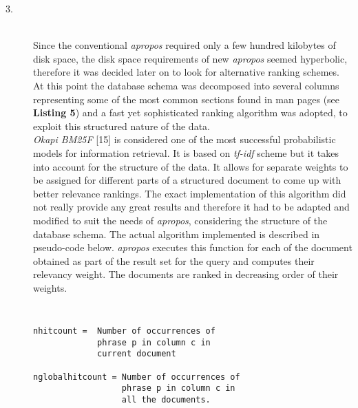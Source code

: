 \documentclass[letterpaper,twocolumn,10pt]{article}
\begin{document}
\begin{description}
\item[3.] \hfill \\
Since the conventional \textit{apropos} required only a few hundred kilobytes of
disk space, the disk space requirements of new \textit{apropos} seemed
hyperbolic, therefore it was decided later on to look for alternative ranking
schemes. At this point the database schema was decomposed into several columns
representing some of the most common sections found in man pages
(see {\bf Listing 5}) and a fast yet sophisticated ranking algorithm was adopted,
to exploit this structured nature of the data. \\

\emph{Okapi BM25F} [15] is considered one of the most successful probabilistic
models for information retrieval. It is based on \emph{tf-idf}
scheme but it takes into account for the structure of the data. It allows for
separate weights to be assigned for different parts of a structured document to
come up with better relevance rankings. The exact implementation of this
algorithm did not really provide any great results and therefore it had to be
adapted and modified to suit the needs of \textit{apropos}, considering the
structure of the database schema. The actual algorithm implemented is
described in pseudo-code below. \textit{apropos} executes this function for each
of the document obtained as part of the result set for the query and computes
their relevancy weight. The documents are ranked in decreasing order of their
weights. \\

{\tt
{}
\begin{lstlisting}
nhitcount =  Number of occurrences of
             phrase p in column c in
             current document

nglobalhitcount = Number of occurrences of
                  phrase p in column c in
                  all the documents.


\end{lstlisting}}
\end{description}
\end{document}
